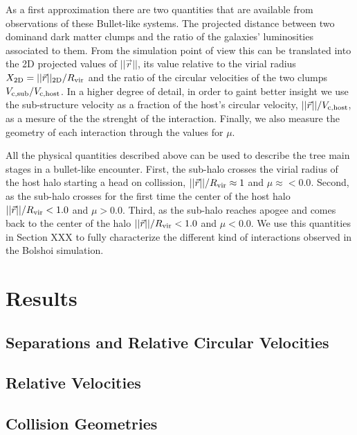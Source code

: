 \documentclass{emulateapj}
\begin{document}
As a first approximation there are two quantities that are available
from observations of these Bullet-like systems. The projected distance
between two dominand dark matter clumps and the ratio of the
galaxies' luminosities associated to them. From the simulation point
of view this can be translated into the 2D projected values of
$||\vec{r}||$, its value relative to the virial radius $X_{\rm 2D}=
||\vec{r}||_{\rm 2D}/R_{\rm vir}$ and the ratio of the circular velocities
of the two clumps $V_{\rm c,sub}/V_{\rm c,host}$. In a higher degree
of detail, in order to gaint better insight we use
the sub-structure velocity as a fraction of the host's circular
velocity, $||\vec{r}||/V_{\rm c, host}$, as a mesure of the the strenght
of the interaction.  Finally, we also measure the geometry of each
interaction through the values for $\mu$.


All the physical quantities described above can be used to describe
the tree main stages in a bullet-like encounter. First, the sub-halo
crosses the virial radius of the host halo starting a head on
collission, $||\vec{r}||/R_{\rm vir}\approx 1$ and
$\mu\approx<0.0$. Second, as the sub-halo crosses for the first time
the center of the host halo $||\vec{r}||/R_{\rm vir} < 1.0$ and
$\mu>0.0$. Third, as the sub-halo reaches apogee and comes back to the
center of the halo $||\vec{r}||/R_{\rm vir} < 1.0$ and $\mu<0.0$. We use
this quantities in Section XXX to fully characterize the different
kind of interactions observed in the Bolshoi simulation. 



\section{Results}
\label{sec:results}

\subsection{Separations and Relative Circular Velocities}
\label{fig:separations}

\subsection{Relative Velocities}
\label{fig:velocities}

\subsection{Collision Geometries}
\label{fig:geometry}
\end{document}
